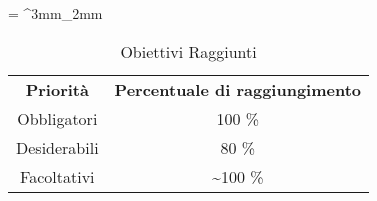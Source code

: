 \tabulinesep = ^3mm_2mm
\begin{longtabu} to \textwidth {cc}
    \caption[Obiettivi Raggiunti]{Obiettivi Raggiunti}
    \label{tab:resume}
    \endlastfoot
    \rowfont{\bfseries\sffamily\leavevmode\color{white}}
    \textbf{Priorità} & \textbf{Percentuale di raggiungimento}\\
    Obbligatori & 100 \% \\ 
    Desiderabili & 80 \% \\ 
    Facoltativi & \textasciitilde100 \% \\ 
\end{longtabu}